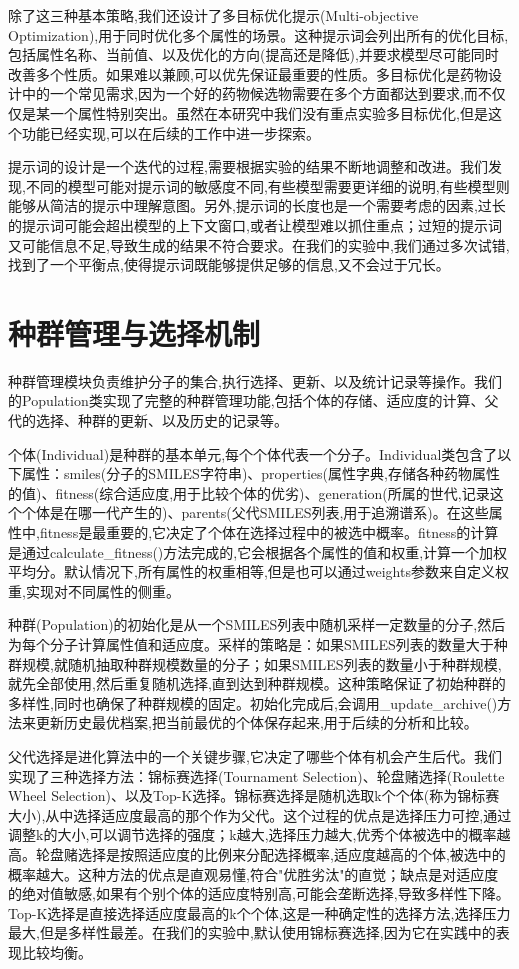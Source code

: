 除了这三种基本策略,我们还设计了多目标优化提示(Multi-objective Optimization),用于同时优化多个属性的场景。这种提示词会列出所有的优化目标,包括属性名称、当前值、以及优化的方向(提高还是降低),并要求模型尽可能同时改善多个性质。如果难以兼顾,可以优先保证最重要的性质。多目标优化是药物设计中的一个常见需求,因为一个好的药物候选物需要在多个方面都达到要求,而不仅仅是某一个属性特别突出。虽然在本研究中我们没有重点实验多目标优化,但是这个功能已经实现,可以在后续的工作中进一步探索。

提示词的设计是一个迭代的过程,需要根据实验的结果不断地调整和改进。我们发现,不同的模型可能对提示词的敏感度不同,有些模型需要更详细的说明,有些模型则能够从简洁的提示中理解意图。另外,提示词的长度也是一个需要考虑的因素,过长的提示词可能会超出模型的上下文窗口,或者让模型难以抓住重点；过短的提示词又可能信息不足,导致生成的结果不符合要求。在我们的实验中,我们通过多次试错,找到了一个平衡点,使得提示词既能够提供足够的信息,又不会过于冗长。

\section{种群管理与选择机制}

种群管理模块负责维护分子的集合,执行选择、更新、以及统计记录等操作。我们的Population类实现了完整的种群管理功能,包括个体的存储、适应度的计算、父代的选择、种群的更新、以及历史的记录等。

个体(Individual)是种群的基本单元,每个个体代表一个分子。Individual类包含了以下属性：smiles(分子的SMILES字符串)、properties(属性字典,存储各种药物属性的值)、fitness(综合适应度,用于比较个体的优劣)、generation(所属的世代,记录这个个体是在哪一代产生的)、parents(父代SMILES列表,用于追溯谱系)。在这些属性中,fitness是最重要的,它决定了个体在选择过程中的被选中概率。fitness的计算是通过calculate\_fitness()方法完成的,它会根据各个属性的值和权重,计算一个加权平均分。默认情况下,所有属性的权重相等,但是也可以通过weights参数来自定义权重,实现对不同属性的侧重。

种群(Population)的初始化是从一个SMILES列表中随机采样一定数量的分子,然后为每个分子计算属性值和适应度。采样的策略是：如果SMILES列表的数量大于种群规模,就随机抽取种群规模数量的分子；如果SMILES列表的数量小于种群规模,就先全部使用,然后重复随机选择,直到达到种群规模。这种策略保证了初始种群的多样性,同时也确保了种群规模的固定。初始化完成后,会调用\_update\_archive()方法来更新历史最优档案,把当前最优的个体保存起来,用于后续的分析和比较。

父代选择是进化算法中的一个关键步骤,它决定了哪些个体有机会产生后代。我们实现了三种选择方法：锦标赛选择(Tournament Selection)、轮盘赌选择(Roulette Wheel Selection)、以及Top-K选择。锦标赛选择是随机选取k个个体(称为锦标赛大小),从中选择适应度最高的那个作为父代。这个过程的优点是选择压力可控,通过调整k的大小,可以调节选择的强度；k越大,选择压力越大,优秀个体被选中的概率越高。轮盘赌选择是按照适应度的比例来分配选择概率,适应度越高的个体,被选中的概率越大。这种方法的优点是直观易懂,符合"优胜劣汰"的直觉；缺点是对适应度的绝对值敏感,如果有个别个体的适应度特别高,可能会垄断选择,导致多样性下降。Top-K选择是直接选择适应度最高的k个个体,这是一种确定性的选择方法,选择压力最大,但是多样性最差。在我们的实验中,默认使用锦标赛选择,因为它在实践中的表现比较均衡。

